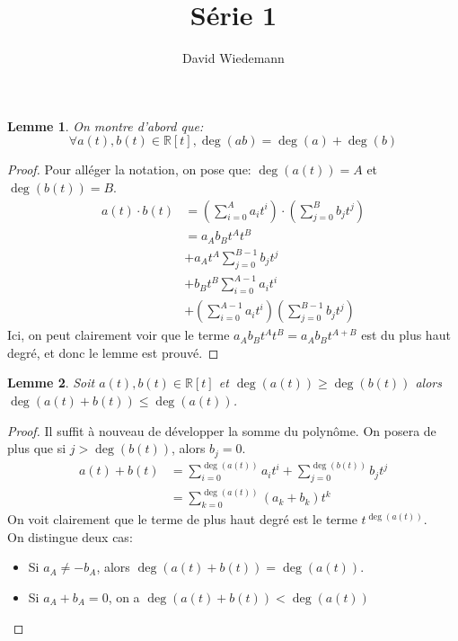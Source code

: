 \documentclass[11pt, a4paper, twoside]{article}
\newtheorem{lemma}{Lemme}
\begin{document}
\title{Série 1}
\author{David Wiedemann}
\maketitle
\begin{lemma}\label{degres}
On montre d'abord que:
\[ 
	\forall a(t) , b(t) \in \mathbb{R}[t], \deg (ab) = \deg(a) + \deg(b)
\]

\end{lemma}
\begin{proof}
Pour alléger la notation, on pose que: $\deg(a(t)) = A$ et $\deg(b(t)) = B$.\\
\begin{align*}
	a(t) \cdot b(t) &= \left( \sum_{i=0}^{A}a_i t^{i}\right) \cdot \left( \sum_{j=0}^{B}b_j t^{j}\right)\\
			&= a_A b_B t^{A} t^{B}\\
			&+ a_A t^{A} \sum_{j=0}^{B-1} b_j t^{j}\\
			&+ b_B t^{B} \sum_{i=0}^{A-1}a_i t^{i}\\
			&+ \left( \sum_{i=0}^{A-1} a_i t^{i}\right) \left( \sum_{j=0}^{B-1}b_j t^{j}\right)
\end{align*}
Ici, on peut clairement voir que le terme $a_A b_B t^{A} t^{B} =a_A b_B t^{A+B} $ est du plus haut degré, et donc le lemme est prouvé.
\end{proof}
\begin{lemma}\label{somme}
	Soit $a(t), b(t) \in \mathbb{R}[t]$ et $\deg(a(t))\geq\deg(b(t))$ alors $\deg(a(t) + b(t)) \leq \deg (a(t))$.
\end{lemma}
\begin{proof}
Il suffit à nouveau de développer la somme du polynôme.
On posera de plus que si $j>\deg(b(t))$, alors $b_j=0$.
\begin{align*}
	a(t) + b(t) &= \sum_{i=0}^{\deg(a(t))} a_i t^{i} + \sum_{j=0}^{\deg(b(t))} b_j t^{j}\\
		    &= \sum_{k=0}^{\deg(a(t))} (a_k + b_k) t^{k}
\end{align*}
On voit clairement que le terme de plus haut degré est le terme $t^{\deg(a(t))}$.\\
On distingue deux cas:
\begin{itemize}
	\item Si $a_A \neq -b_A$, alors $\deg(a(t)+ b(t)) = \deg(a(t))$.\\
	\item Si $a_A+b_A=0$, on a $\deg(a(t)+ b(t)) < \deg(a(t))$
\end{itemize}
\end{proof}
\end{document}
